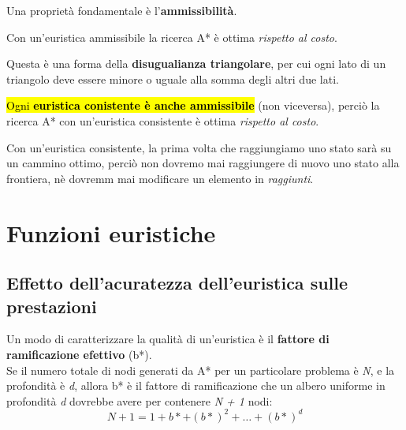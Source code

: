 \documentclass[12pt, a4paper, oneside]{book}
\begin{document}
    Una proprietà fondamentale è l'\textbf{ammissibilità}.


    Con un'euristica ammissibile la ricerca A* è ottima \textit{rispetto al costo}. \\[0.5ex]


    Questa è una forma della \textbf{disugualianza triangolare}, per cui ogni lato di un triangolo deve essere minore o uguale alla somma degli altri due lati.

    \hl{Ogni \textbf{euristica conistente è anche ammissibile}} (non viceversa), perciò la ricerca A* con un'euristica consistente è ottima \textit{rispetto al costo}.

    Con un'euristica consistente, la prima volta che raggiungiamo uno stato sarà su un cammino ottimo, perciò non dovremo mai raggiungere di nuovo uno stato alla frontiera, nè dovremm mai modificare un elemento in \textit{raggiunti}.


    \section{Funzioni euristiche}

    \subsection{Effetto dell'acuratezza dell'euristica sulle prestazioni}
    Un modo di caratterizzare la qualità di un'euristica è il \textbf{fattore di ramificazione efettivo} (b*). \\[0.2ex]
    Se il numero totale di nodi generati da A* per un particolare problema è \textit{N}, e la profondità è \textit{d}, allora b* è il fattore di ramificazione che un albero uniforme in profondità \textit{d} dovrebbe avere per contenere \textit{N + 1} nodi:
    \begin{equation*}
      N + 1 = 1 + b* + (b*)^2 + \dots + (b*)^d
    \end{equation*}
\end{document}
